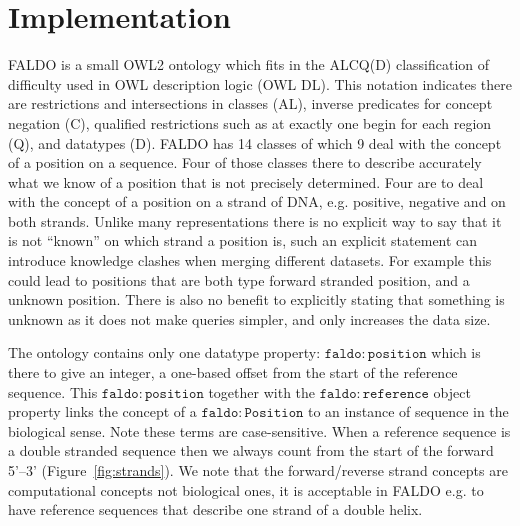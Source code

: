 \section*{Implementation}

FALDO is a small OWL2 ontology which fits in the ALCQ(D) classification of difficulty
used in OWL description logic (OWL DL).
This notation indicates there are restrictions and intersections in classes (AL),
inverse predicates for  concept negation (C),
qualified restrictions such as at exactly one begin for each region (Q), and datatypes (D).
FALDO has 14 classes of which 9 deal with the concept of a position on a sequence. 
Four of those classes there to describe accurately what we know of a position that is not precisely determined. 
Four are to deal with the concept of a position on a strand of DNA, e.g. positive, negative and on both strands.
Unlike many representations there is no explicit way to say that it is not ``known'' on which strand a position is,
such an explicit statement can introduce knowledge clashes when merging different datasets.
For example this could lead to positions that are both type forward stranded position, and a unknown position.
There is also no benefit to explicitly stating that something is unknown as it does not make queries simpler,
and only increases the data size.

The ontology contains only one datatype property: $\mathtt{faldo\colon{}position}$ which is there to give an integer,
a one-based offset from the start of the reference sequence.
This $\mathtt{faldo\colon{}position}$ together with the $\mathtt{faldo\colon{}reference}$ object property links the concept
of a $\mathtt{faldo\colon{}Position}$ to an instance of sequence in the biological sense.
Note these terms are case-sensitive. 
When a reference sequence is a double stranded sequence then we always count from the start of the forward 5'--3' (Figure~\ref{fig:strands}). 
We note that the forward/reverse strand concepts are computational concepts not biological ones, it is acceptable in FALDO e.g. to have reference sequences that describe one strand of a double helix.



